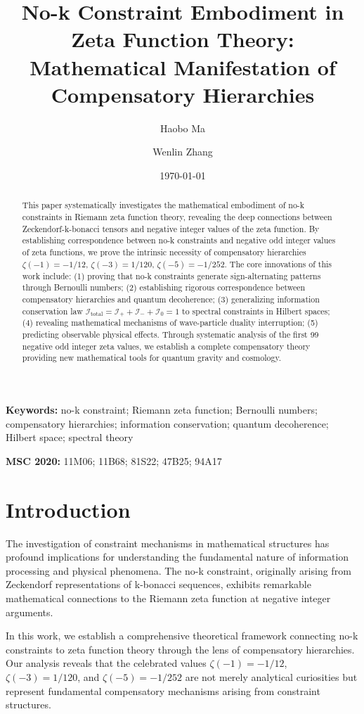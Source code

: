 \documentclass[12pt]{article}
\title{No-k Constraint Embodiment in Zeta Function Theory: \\
Mathematical Manifestation of Compensatory Hierarchies}
\author{Haobo Ma \and Wenlin Zhang}
\date{\today}
\begin{document}
\maketitle

\begin{abstract}
This paper systematically investigates the mathematical embodiment of no-k constraints in Riemann zeta function theory, revealing the deep connections between Zeckendorf-k-bonacci tensors and negative integer values of the zeta function. By establishing correspondence between no-k constraints and negative odd integer values of zeta functions, we prove the intrinsic necessity of compensatory hierarchies $\zeta(-1) = -1/12$, $\zeta(-3) = 1/120$, $\zeta(-5) = -1/252$. The core innovations of this work include: (1) proving that no-k constraints generate sign-alternating patterns through Bernoulli numbers; (2) establishing rigorous correspondence between compensatory hierarchies and quantum decoherence; (3) generalizing information conservation law $\mathcal{I}_{\text{total}} = \mathcal{I}_+ + \mathcal{I}_- + \mathcal{I}_0 = 1$ to spectral constraints in Hilbert spaces; (4) revealing mathematical mechanisms of wave-particle duality interruption; (5) predicting observable physical effects. Through systematic analysis of the first 99 negative odd integer zeta values, we establish a complete compensatory theory providing new mathematical tools for quantum gravity and cosmology.
\end{abstract}

\textbf{Keywords:} no-k constraint; Riemann zeta function; Bernoulli numbers; compensatory hierarchies; information conservation; quantum decoherence; Hilbert space; spectral theory

\textbf{MSC 2020:} 11M06; 11B68; 81S22; 47B25; 94A17

\section{Introduction}

The investigation of constraint mechanisms in mathematical structures has profound implications for understanding the fundamental nature of information processing and physical phenomena. The no-k constraint, originally arising from Zeckendorf representations of k-bonacci sequences, exhibits remarkable mathematical connections to the Riemann zeta function at negative integer arguments.

In this work, we establish a comprehensive theoretical framework connecting no-k constraints to zeta function theory through the lens of compensatory hierarchies. Our analysis reveals that the celebrated values $\zeta(-1) = -1/12$, $\zeta(-3) = 1/120$, and $\zeta(-5) = -1/252$ are not merely analytical curiosities but represent fundamental compensatory mechanisms arising from constraint structures.
\end{document}
